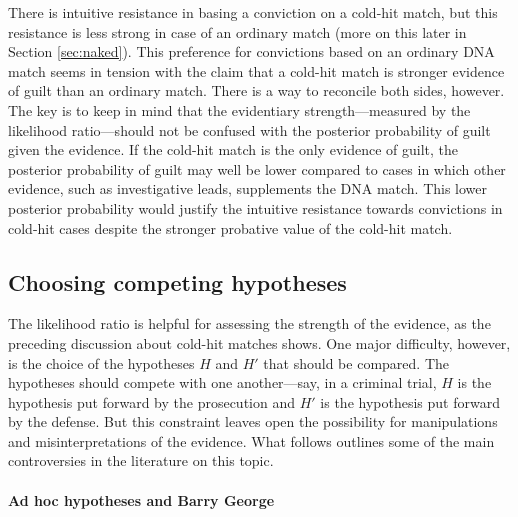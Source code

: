 \documentclass{article}
\begin{document}
There is intuitive resistance in basing a conviction on a cold-hit match, but this resistance is less strong in case of an ordinary match (more on this later in Section \ref{sec:naked}). This preference for convictions based on an ordinary DNA match seems in tension with the claim that a cold-hit match is stronger evidence of guilt than an ordinary match. There is a way to reconcile both sides, however. The key is to keep in mind that the evidentiary strength---measured by the likelihood ratio---should not be confused with the posterior probability of guilt given the evidence. 
If the cold-hit match is the only evidence of guilt, the posterior probability of guilt may well be lower compared to cases in which other evidence, such as investigative leads, supplements the DNA match. This lower posterior probability would justify the intuitive resistance towards convictions in 
cold-hit cases despite the stronger probative value of the cold-hit match. 













\subsection{Choosing competing hypotheses}
 \label{subsec:chose-h}
 
The likelihood ratio is helpful for assessing the strength of the evidence, as the preceding discussion about cold-hit matches shows. 
One major difficulty, however,  is the choice of  the hypotheses $H$ and $H'$ that should be compared. The hypotheses should compete with one another---say, in a criminal trial, $H$ is the hypothesis put forward by the prosecution and $H'$ is the hypothesis put forward by the defense. %
But this constraint leaves open the possibility for manipulations and misinterpretations of the evidence. What follows outlines some of the main controversies in the literature on this topic. 



\paragraph{Ad hoc hypotheses and Barry George}
\end{document}
